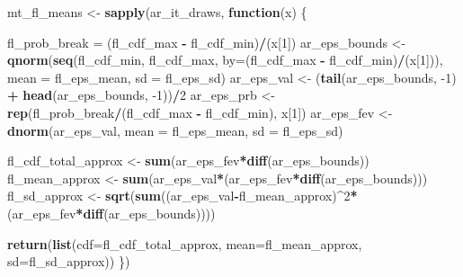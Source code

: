 \documentclass[
]{book}
\newenvironment{Shaded}{\begin{snugshade}}{\end{snugshade}}
\newcommand{\ControlFlowTok}[1]{\textcolor[rgb]{0.13,0.29,0.53}{\textbf{#1}}}
\newcommand{\DataTypeTok}[1]{\textcolor[rgb]{0.13,0.29,0.53}{#1}}
\newcommand{\DecValTok}[1]{\textcolor[rgb]{0.00,0.00,0.81}{#1}}
\newcommand{\KeywordTok}[1]{\textcolor[rgb]{0.13,0.29,0.53}{\textbf{#1}}}
\newcommand{\NormalTok}[1]{#1}
\newcommand{\OperatorTok}[1]{\textcolor[rgb]{0.81,0.36,0.00}{\textbf{#1}}}
\newcommand{\StringTok}[1]{\textcolor[rgb]{0.31,0.60,0.02}{#1}}
\begin{document}
\begin{Shaded}
\begin{Highlighting}[]
\NormalTok{mt\_fl\_means \textless{}{-}}
\StringTok{  }\KeywordTok{sapply}\NormalTok{(ar\_it\_draws, }\ControlFlowTok{function}\NormalTok{(x) \{}

\NormalTok{    fl\_prob\_break =}\StringTok{ }\NormalTok{(fl\_cdf\_max }\OperatorTok{{-}}\StringTok{ }\NormalTok{fl\_cdf\_min)}\OperatorTok{/}\NormalTok{(x[}\DecValTok{1}\NormalTok{])}
\NormalTok{    ar\_eps\_bounds \textless{}{-}}\StringTok{ }\KeywordTok{qnorm}\NormalTok{(}\KeywordTok{seq}\NormalTok{(fl\_cdf\_min, fl\_cdf\_max,}
                               \DataTypeTok{by=}\NormalTok{(fl\_cdf\_max }\OperatorTok{{-}}\StringTok{ }\NormalTok{fl\_cdf\_min)}\OperatorTok{/}\NormalTok{(x[}\DecValTok{1}\NormalTok{])),}
                           \DataTypeTok{mean =}\NormalTok{ fl\_eps\_mean, }\DataTypeTok{sd =}\NormalTok{ fl\_eps\_sd)}
\NormalTok{    ar\_eps\_val \textless{}{-}}\StringTok{ }\NormalTok{(}\KeywordTok{tail}\NormalTok{(ar\_eps\_bounds, }\DecValTok{{-}1}\NormalTok{) }\OperatorTok{+}\StringTok{ }\KeywordTok{head}\NormalTok{(ar\_eps\_bounds, }\DecValTok{{-}1}\NormalTok{))}\OperatorTok{/}\DecValTok{2}
\NormalTok{    ar\_eps\_prb \textless{}{-}}\StringTok{ }\KeywordTok{rep}\NormalTok{(fl\_prob\_break}\OperatorTok{/}\NormalTok{(fl\_cdf\_max }\OperatorTok{{-}}\StringTok{ }\NormalTok{fl\_cdf\_min), x[}\DecValTok{1}\NormalTok{])}
\NormalTok{    ar\_eps\_fev \textless{}{-}}\StringTok{ }\KeywordTok{dnorm}\NormalTok{(ar\_eps\_val,}
                        \DataTypeTok{mean =}\NormalTok{ fl\_eps\_mean, }\DataTypeTok{sd =}\NormalTok{ fl\_eps\_sd)}

\NormalTok{    fl\_cdf\_total\_approx \textless{}{-}}\StringTok{ }\KeywordTok{sum}\NormalTok{(ar\_eps\_fev}\OperatorTok{*}\KeywordTok{diff}\NormalTok{(ar\_eps\_bounds))}
\NormalTok{    fl\_mean\_approx \textless{}{-}}\StringTok{ }\KeywordTok{sum}\NormalTok{(ar\_eps\_val}\OperatorTok{*}\NormalTok{(ar\_eps\_fev}\OperatorTok{*}\KeywordTok{diff}\NormalTok{(ar\_eps\_bounds)))}
\NormalTok{    fl\_sd\_approx \textless{}{-}}\StringTok{ }\KeywordTok{sqrt}\NormalTok{(}\KeywordTok{sum}\NormalTok{((ar\_eps\_val}\OperatorTok{{-}}\NormalTok{fl\_mean\_approx)}\OperatorTok{\^{}}\DecValTok{2}\OperatorTok{*}\NormalTok{(ar\_eps\_fev}\OperatorTok{*}\KeywordTok{diff}\NormalTok{(ar\_eps\_bounds))))}

    \KeywordTok{return}\NormalTok{(}\KeywordTok{list}\NormalTok{(}\DataTypeTok{cdf=}\NormalTok{fl\_cdf\_total\_approx, }\DataTypeTok{mean=}\NormalTok{fl\_mean\_approx, }\DataTypeTok{sd=}\NormalTok{fl\_sd\_approx))}
\NormalTok{  \})}


\end{Highlighting}
\end{Shaded}
\end{document}
